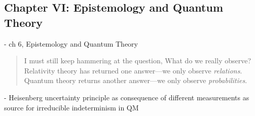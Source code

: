 \subsection{Chapter VI: Epistemology and Quantum Theory}
- ch 6, Epistemology and Quantum Theory

\begin{quote}
    I must still keep hammering at the question, What do we really observe?  Relativity theory has returned one answer---we only observe \emph{relations}.  Quantum theory returns another answer---we only observe \emph{probabilities}. \citep[p. 89]{Eddington1939}
\end{quote}

- Heisenberg uncertainty principle as consequence of different measurements as source for irreducible indeterminism in QM

